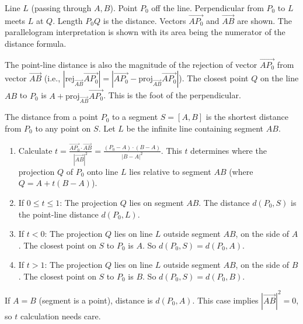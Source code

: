 \begin{visualexample}
\label{vis:A.1.3.point_line_dist}
Line $L$ (passing through $A, B$). Point $P_0$ off the line. Perpendicular from $P_0$ to $L$ meets $L$ at $Q$. Length $P_0Q$ is the distance. Vectors $\vec{AP_0}$ and $\vec{AB}$ are shown. The parallelogram interpretation is shown with its area being the numerator of the distance formula.
\end{visualexample}

\begin{mathinsight}
\label{mathinsight:A.1.3.point_line_rejection}
The point-line distance is also the magnitude of the rejection of vector $\vec{AP_0}$ from vector $\vec{AB}$ (i.e., $|\text{rej}_{\vec{AB}} \vec{AP_0}| = |\vec{AP_0} - \text{proj}_{\vec{AB}} \vec{AP_0}|$). The closest point $Q$ on the line $AB$ to $P_0$ is $A + \text{proj}_{\vec{AB}} \vec{AP_0}$. This is the foot of the perpendicular.
\end{mathinsight}

\begin{definition}
\label{def:A.1.3.point_segment_dist}
The distance from a point $P_0$ to a segment $S=[A,B]$ is the shortest distance from $P_0$ to any point on $S$.
Let $L$ be the infinite line containing segment $AB$.
\begin{enumerate}
    \item Calculate $t = \frac{\vec{AP_0} \cdot \vec{AB}}{|\vec{AB}|^2} = \frac{(P_0-A)\cdot(B-A)}{|B-A|^2}$. This $t$ determines where the projection $Q$ of $P_0$ onto line $L$ lies relative to segment $AB$ (where $Q = A + t(B-A)$).
    \item If $0 \le t \le 1$: The projection $Q$ lies on segment $AB$. The distance $d(P_0, S)$ is the point-line distance $d(P_0, L)$.
    \item If $t < 0$: The projection $Q$ lies on line $L$ outside segment $AB$, on the side of $A$. The closest point on $S$ to $P_0$ is $A$. So $d(P_0, S) = d(P_0, A)$.
    \item If $t > 1$: The projection $Q$ lies on line $L$ outside segment $AB$, on the side of $B$. The closest point on $S$ to $P_0$ is $B$. So $d(P_0, S) = d(P_0, B)$.
\end{enumerate}
If $A=B$ (segment is a point), distance is $d(P_0,A)$. This case implies $|\vec{AB}|^2=0$, so $t$ calculation needs care.
\end{definition}

